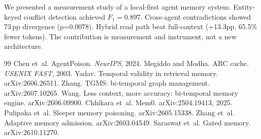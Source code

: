 \documentclass{llncs}
\begin{document}
We presented a measurement study of a local-first agent memory system. Entity-keyed conflict detection achieved $F_1{=}0.897$. Cross-agent contradictions showed 73\,pp divergence (p=0.0078). Hybrid read path beat full-context (+13.3pp, 65.5\% fewer tokens). The contribution is measurement and instrument, not a new architecture.\enlargethispage{20\baselineskip}
\begin{thebibliography}{99}
Chen et~al. AgentPoison. \emph{NeurIPS}, 2024.
Megiddo and Modha. ARC cache. \emph{USENIX FAST}, 2003.
Yadav. Temporal validity in retrieval memory. arXiv:2606.26511.
Zhang. TGMS: bi-temporal graph management. arXiv:2607.10265.
Wang. Less context, more accuracy: bi-temporal memory engine. arXiv:2606.09900.
Chhikara et~al. Mem0. arXiv:2504.19413, 2025.
Pulipaka et~al. Sleeper memory poisoning. arXiv:2605.15338.
Zhang et~al. Adaptive memory admission. arXiv:2603.04549.
Saraswat et~al. Gated memory. arXiv:2610.11270.\end{thebibliography}
\end{document}
